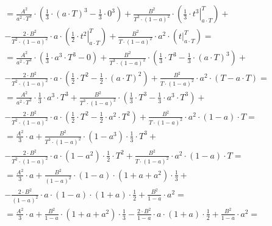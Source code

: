 \begin{task}
\begin{align*}
 &=\frac{A^2}{a^2 \cdot T^3}\cdot \left(\frac{1}{3}\cdot \left(a \cdot T\right)^3 - \frac{1}{3}\cdot 0^3 \right)
 +\frac{B^2}{T^3 \cdot \left(1 - a \right)^2}\cdot \left( \left. \frac{1}{3} \cdot t^3 \right|_{a \cdot T}^{T} \right) +\\
 &- \frac{2\cdot B^2}{T^2 \cdot \left(1 - a\right)^2}\cdot a \cdot \left( \left. \frac{1}{2} \cdot t^2 \right|_{a \cdot T}^{T} \right)
 + \frac{B^2}{T \cdot \left(1 - a \right)^2} \cdot a^2 \cdot \left( \left. t \right|_{a \cdot T}^{T} \right)=\\
 &=\frac{A^2}{a^2 \cdot T^3}\cdot \left(\frac{1}{3}\cdot a^3 \cdot T^3 - 0 \right)
 +\frac{B^2}{T^3 \cdot \left(1 - a \right)^2}\cdot \left( \frac{1}{3} \cdot T^3 -\frac{1}{3} \cdot \left( a\cdot T \right)^3 \right) +\\
 &- \frac{2\cdot B^2}{T^2\cdot \left(1 - a\right)^2}\cdot a \cdot \left( \frac{1}{2} \cdot T^2 -  \frac{1}{2} \cdot \left(a \cdot T\right)^2 \right)
 + \frac{B^2}{T \cdot \left(1 - a \right)^2} \cdot a^2 \cdot \left( T - a \cdot T \right)=\\
 &=\frac{A^2}{a^2 \cdot T^3}\cdot \frac{1}{3}\cdot a^3 \cdot T^3
 +\frac{B^2}{T^3 \cdot \left(1 - a \right)^2}\cdot \left( \frac{1}{3} \cdot T^3 -\frac{1}{3} \cdot a^3 \cdot T ^3 \right) +\\
 &- \frac{2\cdot B^2}{T^2 \cdot \left(1 - a\right)^2}\cdot a \cdot \left( \frac{1}{2} \cdot T^2 -  \frac{1}{2} \cdot a^2 \cdot T^2 \right)
 + \frac{B^2}{T \cdot \left(1 - a \right)^2} \cdot a^2 \cdot \left( 1 - a\right) \cdot T=\\
 &=\frac{A^2}{3}\cdot a
 +\frac{B^2}{T^3 \cdot \left(1 - a \right)^2}\cdot \left(1 -a^3 \right)\cdot \frac{1}{3} \cdot T^3 +\\
 &- \frac{2\cdot B^2}{T^2\cdot \left(1 - a\right)^2}\cdot a \cdot \left( 1 -   a^2 \right) \cdot \frac{1}{2} \cdot T^2
 + \frac{B^2}{T \cdot \left(1 - a \right)^2} \cdot a^2 \cdot \left( 1 - a\right) \cdot T=\\ 
 &=\frac{A^2}{3}\cdot a
 +\frac{B^2}{\left(1 - a\right)^2}\cdot \left(1-a\right)\cdot \left(1 +a + a^2 \right)\cdot \frac{1}{3}+\\
 &- \frac{2\cdot B^2}{\left(1 - a\right)^2}\cdot a \cdot \left( 1 - a \right) \cdot \left( 1 + a \right) \cdot \frac{1}{2}
 + \frac{B^2}{1 - a} \cdot a^2=\\
 &=\frac{A^2}{3}\cdot a
 +\frac{B^2}{1 - a}\cdot \left(1 +a + a^2 \right)\cdot \frac{1}{3}
 - \frac{2\cdot B^2}{1 - a}\cdot a \cdot \left( 1 + a \right) \cdot \frac{1}{2}
 + \frac{B^2}{1 - a} \cdot a^2=\\

\end{align*}
\end{task}
